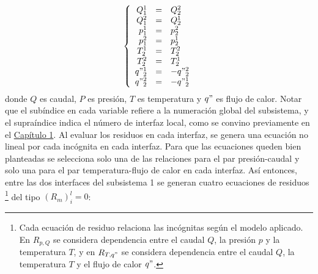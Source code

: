 \begin{equation}
\left\{ \begin{array}{rcl}
Q_1^1&=& Q_2^2 \\
Q_1^2&=& Q_2^1 \\
p_1^1&=& p_2^2 \\
p_1^2&=& p_2^1 \\
T_2^1&=& T_2^2 \\
T_2^2&=& T_2^1 \\
q"_2^1&=& - q"_2^2 \\
q"_2^2&=& - q"_2^1
\end{array}
\right.
\end{equation}
donde $Q$ es caudal, $P$ es presión, $T$ es temperatura y $q"$ es flujo de calor. 
Notar que el subíndice en cada variable refiere a la numeración global del subsistema, y el supraíndice indica el número de interfaz local,
como se convino previamente en el \hyperlink{chapter.1}{Capítulo 1}.
Al evaluar los residuos en cada interfaz, se genera una ecuación no lineal por cada incógnita en cada interfaz.
Para que las ecuaciones queden bien planteadas se selecciona solo una de las relaciones para el par presión-caudal
y solo una para el par temperatura-flujo de calor en cada interfaz.
Así entonces, entre las dos interfaces del subsistema 1 se generan cuatro ecuaciones de residuos
\footnote{
Cada ecuación de residuo relaciona las incógnitas según el modelo aplicado.
En $R_{p,Q}$ se considera dependencia entre el caudal $Q$, la presión $p$ y la temperatura $T$, y en 
$R_{T,q"}$ se considera dependencia entre el caudal $Q$, la temperatura $T$ y el flujo de calor $q"$.
} del tipo $(R_m)_{i}^{l}=0$:

